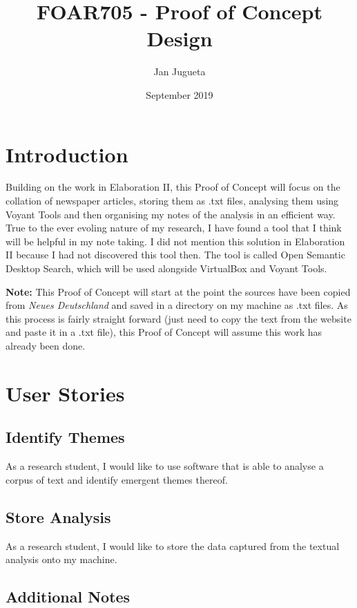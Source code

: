 \documentclass{article}
\title{FOAR705 - Proof of Concept Design}
\author{Jan Jugueta}
\date{September 2019}
\begin{document}
\maketitle

\section*{Introduction}

Building on the work in Elaboration II, this Proof of Concept will focus on the collation of newspaper articles, storing them as .txt files, analysing them using Voyant Tools and then organising my notes of the analysis in an efficient way. True to the ever evoling nature of my research, I have found a tool that I think will be helpful in my note taking. I did not mention this solution in Elaboration II because I had not discovered this tool then. The tool is called Open Semantic Desktop Search, which will be used alongside VirtualBox and Voyant Tools.

\textbf{Note:} This Proof of Concept will start at the point the sources have been copied from \textit{Neues Deutschland} and saved in a directory on my machine as .txt files. As this process is fairly straight forward (just need to copy the text from the website and paste it in a .txt file), this Proof of Concept will assume this work has already been done.

\section*{User Stories}

\subsection*{Identify Themes}

As a research student, I would like to use software that is able to analyse a corpus of text and identify emergent themes thereof.

\subsection*{Store Analysis}

As a research student, I would like to store the data captured from the textual analysis onto my machine.

\subsection*{Additional Notes}
\end{document}
